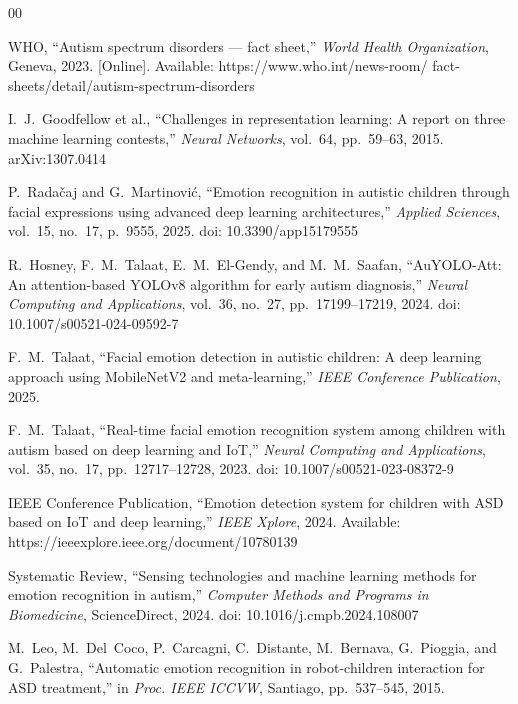 \documentclass[conference]{IEEEtran}
\begin{document}
\begin{thebibliography}{00}

WHO, ``Autism spectrum disorders --- fact sheet,''
\textit{World Health Organization}, Geneva, 2023.
[Online]. Available: https://www.who.int/news-room/
fact-sheets/detail/autism-spectrum-disorders

I.~J.~Goodfellow et al., ``Challenges in representation
learning: A report on three machine learning contests,''
\textit{Neural Networks}, vol.~64, pp.~59--63, 2015.
arXiv:1307.0414

P.~Rada\v{c}aj and G.~Martinovi\'{c}, ``Emotion recognition
in autistic children through facial expressions using advanced
deep learning architectures,''
\textit{Applied Sciences}, vol.~15, no.~17, p.~9555, 2025.
doi: 10.3390/app15179555

R.~Hosney, F.~M.~Talaat, E.~M.~El-Gendy, and M.~M.~Saafan,
``AuYOLO-Att: An attention-based YOLOv8 algorithm for early
autism diagnosis,'' \textit{Neural Computing and Applications},
vol.~36, no.~27, pp.~17199--17219, 2024.
doi: 10.1007/s00521-024-09592-7

F.~M.~Talaat, ``Facial emotion detection in autistic children:
A deep learning approach using MobileNetV2 and meta-learning,''
\textit{IEEE Conference Publication}, 2025.

F.~M.~Talaat, ``Real-time facial emotion recognition system
among children with autism based on deep learning and IoT,''
\textit{Neural Computing and Applications}, vol.~35, no.~17,
pp.~12717--12728, 2023. doi: 10.1007/s00521-023-08372-9

IEEE Conference Publication, ``Emotion detection system for
children with ASD based on IoT and deep learning,''
\textit{IEEE Xplore}, 2024.
Available: https://ieeexplore.ieee.org/document/10780139

Systematic Review, ``Sensing technologies and machine learning
methods for emotion recognition in autism,''
\textit{Computer Methods and Programs in Biomedicine},
ScienceDirect, 2024. doi: 10.1016/j.cmpb.2024.108007

M.~Leo, M.~Del~Coco, P.~Carcagni, C.~Distante, M.~Bernava,
G.~Pioggia, and G.~Palestra, ``Automatic emotion recognition
in robot-children interaction for ASD treatment,''
in \textit{Proc. IEEE ICCVW}, Santiago, pp.~537--545, 2015.


\end{thebibliography}
\end{document}
